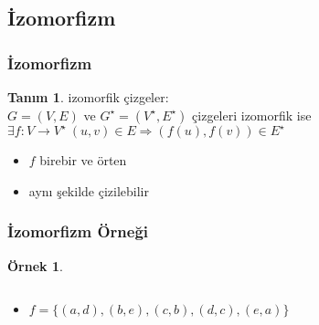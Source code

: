 \documentclass[dvipsnames]{beamer}
\theoremstyle{definition}
\newtheorem{tanim}[theorem]{Tanım}
\theoremstyle{example}
\newtheorem{ornek}[theorem]{Örnek}
\theoremstyle{plain}
\begin{document}
\subsection{İzomorfizm}

\begin{frame}
  \frametitle{İzomorfizm}

  \begin{tanim}
    \alert{izomorfik çizgeler}:\\
    $G=(V,E)$ ve $G^\star=(V^\star,E^\star)$ çizgeleri izomorfik ise\\
    $\exists f: V \rightarrow V^\star~(u,v) \in E \Rightarrow (f(u),f(v)) \in E^\star$

    \begin{itemize}
      \item $f$ birebir ve örten
    \end{itemize}
  \end{tanim}

  \pause
  \begin{itemize}
    \item aynı şekilde çizilebilir
  \end{itemize}
\end{frame}

\begin{frame}
  \frametitle{İzomorfizm Örneği}

  \begin{ornek}
    \begin{columns}
      \begin{center}
      \end{center}

      \begin{center}
      \end{center}
    \end{columns}

    \pause
    \bigskip
    \begin{itemize}
      \item $f = \{(a,d),(b,e),(c,b),(d,c),(e,a)\}$
    \end{itemize}
  \end{ornek}
\end{frame}
\end{document}
